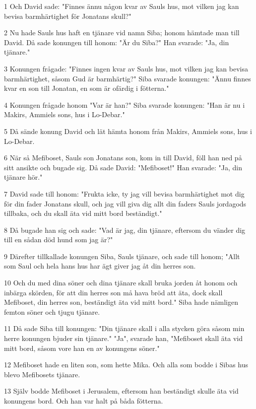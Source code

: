\par 1 Och David sade: "Finnes ännu någon kvar av Sauls hus, mot vilken jag kan bevisa barmhärtighet för Jonatans skull?"
\par 2 Nu hade Sauls hus haft en tjänare vid namn Siba; honom hämtade man till David. Då sade konungen till honom: "Är du Siba?" Han svarade: "Ja, din tjänare."
\par 3 Konungen frågade: "Finnes ingen kvar av Sauls hus, mot vilken jag kan bevisa barmhärtighet, såsom Gud är barmhärtig?" Siba svarade konungen: "Ännu finnes kvar en son till Jonatan, en som är ofärdig i fötterna."
\par 4 Konungen frågade honom "Var är han?" Siba svarade konungen: "Han är nu i Makirs, Ammiels sons, hus i Lo-Debar."
\par 5 Då sände konung David och lät hämta honom från Makirs, Ammiels sons, hus i Lo-Debar.
\par 6 När så Mefiboset, Sauls son Jonatans son, kom in till David, föll han ned på sitt ansikte och bugade sig. Då sade David: "Mefiboset!" Han svarade: "Ja, din tjänare hör."
\par 7 David sade till honom: "Frukta icke, ty jag vill bevisa barmhärtighet mot dig för din fader Jonatans skull, och jag vill giva dig allt din faders Sauls jordagods tillbaka, och du skall äta vid mitt bord beständigt."
\par 8 Då bugade han sig och sade: "Vad är jag, din tjänare, eftersom du vänder dig till en sådan död hund som jag är?"
\par 9 Därefter tillkallade konungen Siba, Sauls tjänare, och sade till honom; "Allt som Saul och hela hans hus har ägt giver jag åt din herres son.
\par 10 Och du med dina söner och dina tjänare skall bruka jorden åt honom och inbärga skörden, för att din herres son må hava bröd att äta, dock skall Mefiboset, din herres son, beständigt äta vid mitt bord." Siba hade nämligen femton söner och tjugu tjänare.
\par 11 Då sade Siba till konungen: "Din tjänare skall i alla stycken göra såsom min herre konungen bjuder sin tjänare." "Ja", svarade han, "Mefiboset skall äta vid mitt bord, såsom vore han en av konungens söner."
\par 12 Mefiboset hade en liten son, som hette Mika. Och alla som bodde i Sibas hus blevo Mefibosets tjänare.
\par 13 Själv bodde Mefiboset i Jerusalem, eftersom han beständigt skulle äta vid konungens bord. Och han var halt på båda fötterna.

